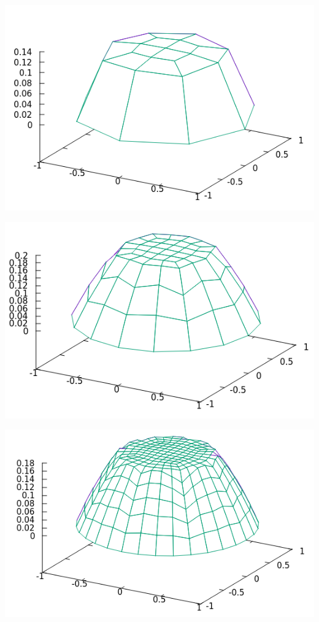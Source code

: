 \documentclass[9pt]{beamer}
\begin{document}
\begin{frame}
	\begin{minipage}{.45\paperwidth}
		\centering
		\includegraphics[scale=.5]{Solu3-0.png}
	\end{minipage}%
	\begin{minipage}{.4\paperwidth}
		\centering
		\includegraphics[scale=.5]{Solu3-1.png}
	\end{minipage}
	\begin{minipage}{.45\paperwidth}
		\centering
		\includegraphics[scale=.5]{Solu3-2.png}

\end{minipage}
\end{frame}
\end{document}
